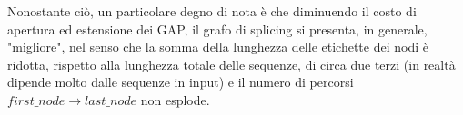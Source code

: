 Nonostante ciò, un particolare degno di nota è che diminuendo il costo di apertura ed estensione dei GAP, il grafo di splicing si presenta, in generale, "migliore", nel senso che la somma della lunghezza delle etichette dei nodi è ridotta, rispetto alla lunghezza totale delle sequenze, di circa due terzi (in realtà dipende molto dalle sequenze in input) e il numero di percorsi $first\_node \to last\_node$ non esplode.











